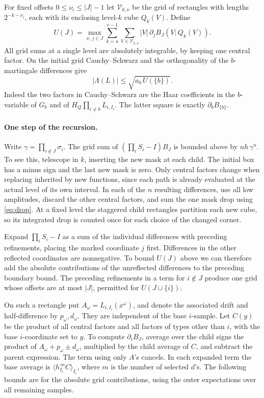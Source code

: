 \documentclass[11pt]{article}
\newcommand{\avg}[2]{\langle #1\rangle_{#2}}
\begin{document}
For fixed offsets \(0\le\nu_i\le |J|-1\) let \(\mathcal V_{k,\nu}\)
be the grid of rectangles with lengths \(2^{-k-\nu_i}\), each with
its enclosing level-\(k\) cube \(Q_k(V)\). Define
\[
 U(J)=\max_{\nu,\,j\in J}
    \sum_{k=u}^{v-1}\sum_{V\in\mathcal V_{k,\nu}}
       |V|\,\partial_j B_J(V;Q_k(V)).
\]
All grid sums at a single level are absolutely integrable, by keeping
one central factor. On the initial grid Cauchy--Schwarz and the
orthogonality of the \(b\)-martingale differences give
\begin{equation}\label{eq:first}
            |\Lambda(L)|\le \sqrt{a_b\,U(\{b\})}.
\end{equation}
Indeed the two factors in Cauchy--Schwarz are the Haar coefficients
in the \(b\)-variable of \(G_b\) and of \(H_Q\prod_{i\ne b}L_{i,I_i}\).
The latter square is exactly \(\partial_bB_{\{b\}}\).

\paragraph{One step of the recursion.}
Write \(\gamma=\prod_{i\notin J}\sigma_i\).
The grid sum of \((\prod_i S_i-I)B_J\) is bounded above by
\(n h\,\gamma^n\). To see this, telescope in \(k\), inserting the
new mask at each child. The initial box has a minus sign and the last
new mask is zero. Only central factors change when replacing inherited
by new functions, since each path is already evaluated at the actual
level of its own interval. In each of the \(n\) resulting differences,
use all low amplitudes, discard the other central factors, and sum the
one mask drop using \eqref{eq:drop}. At a fixed level the staggered
child rectangles partition each new cube, so its integrated drop is
counted once for each choice of the changed corner.

Expand \(\prod_i S_i-I\) as a sum of the individual differences with
preceding refinements, placing the marked coordinate \(j\) first.
Differences in the other reflected coordinates are nonnegative.
To bound \(U(J)\) above we can therefore add the absolute contributions
of the unreflected differences to the preceding boundary bound. The
preceding refinements in a term for \(i\notin J\) produce one grid
whose offsets are at most \(|J|\), permitted for \(U(J\cup\{i\})\).

On such a rectangle put \(A_\omega=L_{i,I_i}(x^\omega)\), and denote
the associated drift and half-difference by \(p_\omega,d_\omega\).
They are independent of the base \(i\)-sample. Let \(C(y)\) be the
product of all central factors and all factors of types other than
\(i\), with the base \(i\)-coordinate set to \(y\).
To compute \(\partial_i B_J\), average over the child signs the
product of \(A_\omega+p_\omega\pm d_\omega\), multiplied by the
child average of \(C\), and subtract the parent expression.
The term using only \(A\)'s cancels. In each expanded term the base
average is \(\avg{h_{I_i}^{\,m}C}{I_i}\), where \(m\) is the
number of selected \(d\)'s. The following bounds are for the absolute
grid contributions, using the outer expectations over all remaining
samples.
\end{document}

